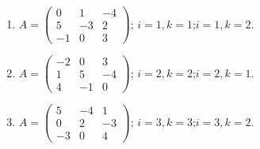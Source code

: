 \begin{enumerate}[label=\arabic*.,  leftmargin=*]
\item $A=\begin{pmatrix}0&1&-4\\5&-3&2\\-1&0&3\end{pmatrix}$; \quad $i=1, k=1$;\quad $i=1, k=2$.
\item $A=\begin{pmatrix}-2&0&3\\1&5&-4\\4&-1&0\end{pmatrix}$; \quad $i=2, k=2$;\quad $i=2, k=1$.
\item $A=\begin{pmatrix}5&-4&1\\0&2&-3\\-3&0&4\end{pmatrix}$; \quad $i=3, k=3$;\quad $i=3, k=2$.
\end{enumerate}
